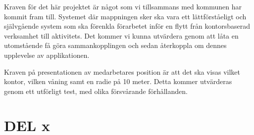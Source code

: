 \documentclass[swedish, a4paper,12pt]{article}
\begin{document}
%
%
%
%
%
Kraven för det här projektet är något som vi tillsammans med kommunen har kommit fram till. Systemet där mappningen sker ska vara ett lättförståeligt och självgående system som ska förenkla förarbetet inför en flytt från kontorsbaserad verksamhet till aktivitets. Det kommer vi kunna utvärdera genom att låta en utomstående få göra sammankopplingen och sedan återkoppla om dennes upplevelse av applikationen.

Kraven på presentationen av medarbetares position är att det ska visas vilket kontor, vilken våning samt en radie på 10 meter. Detta kommer utvärderas genom ett utförligt test, med olika försvårande förhållanden.



\section{DEL x}\label{sec:delX}

\end{document}
